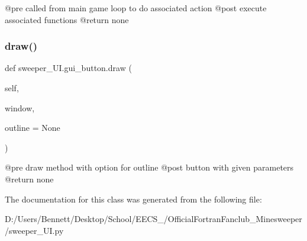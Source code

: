 \begin{DoxyVerb}@pre called from main game loop to do associated action
@post execute associated functions
@return none
\end{DoxyVerb}
 \mbox{\label{classsweeper___u_i_1_1gui__button_ae168198450518f00782017759a8879bd}} 
\subsubsection{\texorpdfstring{draw()}{draw()}}
{\footnotesize\ttfamily def sweeper\+\_\+\+U\+I.\+gui\+\_\+button.\+draw (\begin{DoxyParamCaption}\item[{}]{self,  }\item[{}]{window,  }\item[{}]{outline = {\ttfamily None} }\end{DoxyParamCaption})}

\begin{DoxyVerb}@pre draw method with option for outline
@post button with given parameters
@return none
\end{DoxyVerb}
 

The documentation for this class was generated from the following file\+:\begin{DoxyCompactItemize}
\item 
D\+:/\+Users/\+Bennett/\+Desktop/\+School/\+E\+E\+C\+S\+\_/\+Official\+Fortran\+Fanclub\+\_\+\+Minesweeper/sweeper\+\_\+\+U\+I.\+py\end{DoxyCompactItemize}
